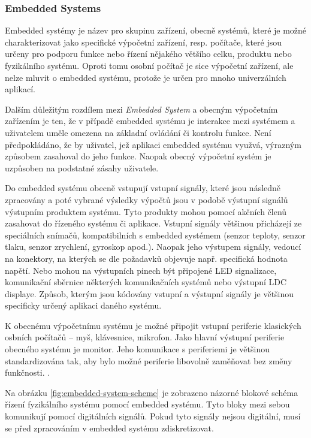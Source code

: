 \documentclass[a4paper, twoside, 11pt]{article}
\begin{document}
	\subsubsection{Embedded Systems}
	Embedded systémy je název pro skupinu zařízení, obecně systémů, které je možné charakterizovat jako specifické výpočetní zařízení, resp. počítače, které jsou určeny pro podporu funkce nebo řízení nějakého většího celku, produktu nebo fyzikálního systému. Oproti tomu osobní počítač je sice výpočetní zařízení, ale nelze mluvit o embedded systému, protože je určen pro mnoho univerzálních aplikací. \cite{Sass2010}\par
	Dalším důležitým rozdílem mezi \textit{Embedded System} a obecným výpočetním zařízením je ten, že v případě embedded systému je interakce mezi systémem a uživatelem uměle omezena na základní ovládání či kontrolu funkce. Není předpokládáno, že by uživatel, jež aplikaci embedded systému využvá, výrazným způsobem zasahoval do jeho funkce. Naopak obecný výpočetní systém je uzpůsoben na podstatné zásahy uživatele. \cite{Sass2010} \cite{juan-fpgas}\par
	Do embedded systému obecně vstupují vstupní signály, které jsou následně zpracovány a poté vybrané výsledky výpočtů jsou v podobě výstupní signálů výstupním produktem systému. Tyto produkty mohou pomocí akčních členů zasahovat do řízeného systému či aplikace. Vstupní signály většinou přicházejí ze speciálních snímačů, kompatibilních s embedded systémem (senzor teploty, senzor tlaku, senzor zrychlení, gyroskop apod.). Naopak jeho výstupem signály, vedoucí na konektory, na kterých se dle požadavků objevuje např. specifická hodnota napětí. Nebo mohou na výstupních pinech být připojené LED signalizace, komunikační sběrnice některých komunikačních systémů nebo výstupní LDC displaye. Způsob, kterým jsou kódovány vstupní a výstupní signály je většinou specificky určený aplikaci daného systému. \cite{Sass2010}\par
	K obecnému výpočetnímu systému je možné připojit vstupní periferie klasických osbních počítačů – myš, klávesnice, mikrofon. Jako hlavní výstupní periferie obecného systému je monitor. Jeho komunikace s periferiemi je většinou standardizována tak, aby bylo možné periferie libovolně zaměňovat bez změny funkčnosti. \cite{Sass2010}.\par
	Na obrázku \ref{fig:embedded-system-scheme} je zobrazeno názorné blokové schéma řízení fyzikálního systému pomocí embedded systému. Tyto bloky mezi sebou komunikují pomocí digitálních signálů. Pokud tyto signály nejsou digitální, musí se před zpracováním v embedded systému zdiskretizovat.
\end{document}

